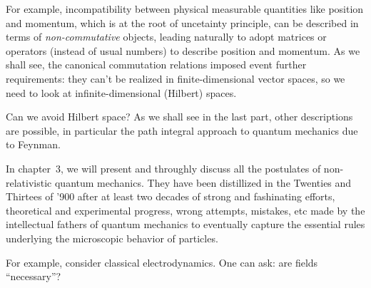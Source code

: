 \begin{refsection}
For example, incompatibility between physical measurable quantities like position and
momentum, which is at the root of uncetainty principle, can be described in
terms of \emph{non-commutative} objects, leading naturally to adopt matrices or
operators (instead of usual numbers) to describe position and momentum.
As we shall see, the canonical commutation relations imposed event further
requirements: they can't be realized in finite-dimensional vector spaces,
so we need to look at infinite-dimensional (Hilbert) spaces. 

Can we avoid Hilbert space?
As we shall see in the last part, other descriptions are possible, in
particular the path integral approach to quantum mechanics due to Feynman. 

In chapter~3, we will present and throughly discuss  all the postulates of  
non-relativistic quantum
mechanics. 
They have been distillized in the Twenties and Thirtees of '900 after  at least two
decades of strong and fashinating efforts, 
theoretical and experimental progress, wrong
attempts, mistakes, etc 
made by the intellectual fathers of quantum mechanics 
to eventually capture the essential  rules underlying 
the microscopic behavior of particles.

For example, consider classical electrodynamics. 
One can ask: are fields ``necessary''?






\end{refsection}
